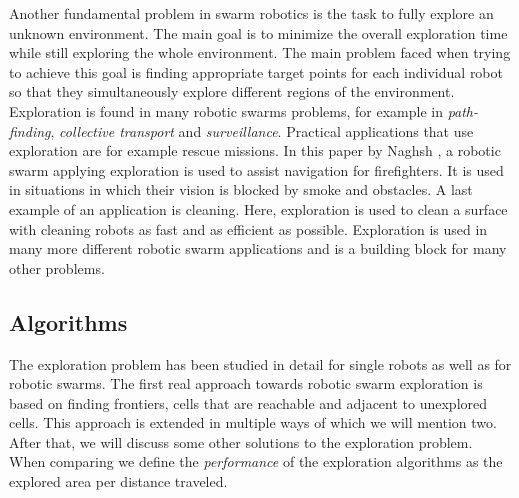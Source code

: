 
Another fundamental problem in swarm robotics is the task to fully explore an unknown environment.
The main goal is to minimize the overall exploration time while still exploring the whole environment. 
The main problem faced when trying to achieve this goal is finding appropriate target points for each individual robot so that they simultaneously explore different regions of the environment. \cite{burgard2005coordinated} \\
Exploration is found in many robotic swarms problems, for example in \emph{path-finding}, \emph{collective transport} and \emph{surveillance}.
Practical applications that use exploration are for example rescue missions. \cite{Naghsh2008,Penders2011}
In this paper by Naghsh \cite{Naghsh2008}, a robotic swarm applying exploration is used to assist navigation for firefighters.
It is used in situations in which their vision is blocked by smoke and obstacles. 
A last example of an application is cleaning. \cite{wagner2008cooperative}
Here, exploration is used to clean a surface with cleaning robots as fast and as efficient as possible. 
Exploration is used in many more different robotic swarm applications and is a building block for many other problems.

\subsection{Algorithms}
The exploration problem has been studied in detail for single robots \cite{lee1997quantitative,albers1999exploring} as well as for robotic swarms.
The first real approach towards robotic swarm exploration is based on finding frontiers, cells that are reachable and adjacent to unexplored cells. \cite{yamauchi1998frontier} This approach is extended in multiple ways of which we will mention two. \cite{solanas2004coordinated,sheng2006distributed}
After that, we will discuss some other solutions to the exploration problem. \cite{singh1993map,zlot2002multi}
When comparing we define the \emph{performance} of the exploration algorithms as the explored area per distance traveled.

